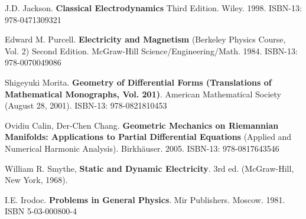 \documentclass[10pt]{amsart}
\begin{document}
\begin{thebibliography}{9}

J.D. Jackson.  \textbf{Classical Electrodynamics} Third Edition.  Wiley.  1998.   ISBN-13: 978-0471309321

Edward M. Purcell.  \textbf{Electricity and Magnetism} (Berkeley Physics Course, Vol. 2) Second Edition.  McGraw-Hill Science/Engineering/Math.  1984.  ISBN-13: 978-0070049086

Shigeyuki Morita.  \textbf{Geometry of Differential Forms (Translations of Mathematical Monographs, Vol. 201)}.  American Mathematical Society (August 28, 2001).   ISBN-13: 978-0821810453

Ovidiu Calin, Der-Chen Chang. \textbf{Geometric Mechanics on Riemannian Manifolds: Applications to Partial Differential Equations} (Applied and Numerical Harmonic Analysis).  Birkh\"{a}user. 2005. ISBN-13: 978-0817643546

William R. Smythe, \textbf{Static and Dynamic Electricity}.  3rd ed. (McGraw-Hill, New York, 1968).  

I.E. Irodoc. \textbf{Problems in General Physics}. Mir Publishers. Moscow. 1981. ISBN 5-03-000800-4

  \end{thebibliography}
\end{document}

